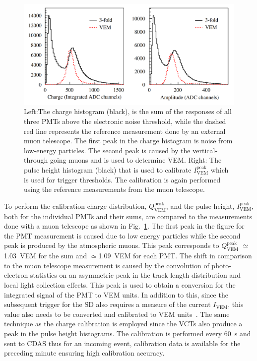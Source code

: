 \begin{figure}[h!]
  \centering
  \includegraphics[width=\textwidth]{thesis_figures/Setup/VEM_Calib_SD.png}
  \caption{Left:The charge histogram (black), is the sum of the responses of all three
  PMTs above the electronic noise threshold, while the dashed red line
  represents the reference measurement done by an external muon telescope.
  The first peak in the charge histogram is noise from low-energy particles. The second peak is caused by the vertical-through going muons and is used to determine VEM. Right: The pulse height histogram (black) that is
  used to calibrate $I^{\text{peak}}_{\text{VEM}}$ which is used for trigger thresholds. The calibration is again performed using the reference measurements from the muon telescope.~\cite{PierreAuger:2005znw}}
  \label{fig:SD_VEM_calib}
\end{figure}

To perform the calibration charge distribution, $Q_{\text{VEM}}^{\text{peak}}$, and the pulse height, $I_{\text{VEM}}^{\text{peak}}$, both for the individual PMTs and their sums, are compared to the measurements done with a muon telescope as shown in Fig.~\ref{fig:SD_VEM_calib}. The first peak in the figure for the PMT measurement is caused due to low energy particles while the second peak is produced by the atmospheric muons. This peak corresponds to $Q_{\text{VEM}}^{\text{peak}}$ $\simeq$ 1.03 VEM for the sum and $\simeq$1.09 VEM for each PMT. The shift in comparison to the muon telescope measurement is caused by the convolution of photo-electron statistics on an asymmetric peak in the track length distribution and local light collection effects. This peak is used to obtain a conversion for the integrated signal of the PMT to VEM units. In addition to this, since the subsequent trigger for the SD also requires a measure of the current $I_{\text{VEM}}$, this value also needs to be converted and calibrated to VEM units~\cite{PierreAuger:2005znw}. The same technique as the charge calibration is employed since the VCTs also produce a peak in the pulse height histograms. The calibration is performed every 60 s and sent to CDAS thus for an incoming event, calibration data is available for the preceding minute ensuring high calibration accuracy. 

